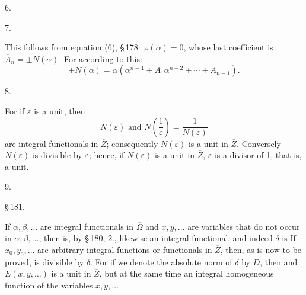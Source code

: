 6. 

7. 

This follows from equation (6), \S\,178: $\varphi(\alpha)=0$, whose last coefficient is $\overline{A}_n=\pm N(\alpha)$. For according to this:
\[
\pm N(\alpha) = \alpha(\alpha^{n-1}+\overline{A}_1\alpha^{n-2}+\cdots+\overline{A}_{n-1}).
\]

8. 

For if $\varepsilon$ is a unit, then
\[
N(\varepsilon) \text{ and } N\left(\frac{1}{\varepsilon}\right) = \frac{1}{N(\varepsilon)}
\]
are integral functionals in $\overline{Z}$; consequently $N(\varepsilon)$ is a unit in $\overline{Z}$. Conversely $N(\varepsilon)$ is divisible by $\varepsilon$; hence, if $N(\varepsilon)$ is a unit in $\overline{Z}$, $\varepsilon$ is a divisor of 1, that is, a unit.

9. 

\begin{center}
\S\,181. 
\end{center}

If $\alpha, \beta, \ldots$ are integral functionals in $\overline{\Omega}$ and $x, y, \ldots$ are variables that do not occur in $\alpha, \beta, \ldots$, then
is, by \S\,180, 2., likewise an integral functional, and indeed $\delta$ is  If $x_0, y_0, \ldots$ are arbitrary integral functions or functionals in $\overline{Z}$, then, as is now to be proved,
is divisible by $\delta$. For if we denote the absolute norm of $\delta$ by $D$, then
and $E(x, y, \ldots)$ is a unit in $\overline{Z}$, but at the same time an integral homogeneous function of the variables $x, y, \ldots$
